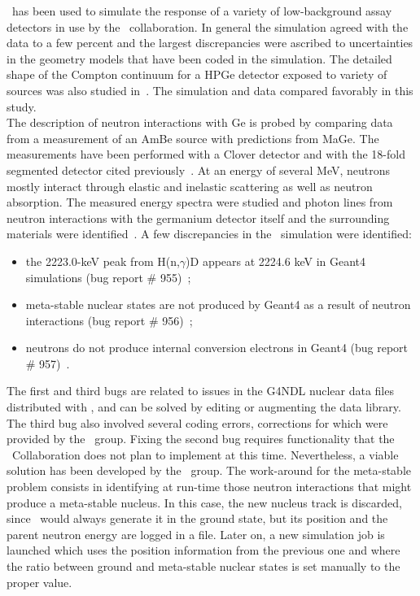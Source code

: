 \documentclass[article]{IEEEtran}
\begin{document}
\MaGe\ has been used to simulate the response of a variety of low-background assay detectors in use by the \MJ\ collaboration. In general the simulation agreed with the data to a few percent and the largest discrepancies were ascribed to uncertainties in the geometry models that have been coded in the 
simulation. 
The detailed shape of the Compton continuum for a HPGe detector exposed to variety of sources was also studied in~\cite{evans}. The simulation and data compared favorably in this study.\\ 

The description of neutron interactions with Ge is probed by comparing data
from a measurement of an AmBe source with predictions from {\sc
MaGe}. The measurements have been performed with a {\sc Clover}
detector and with the 18-fold segmented detector cited 
previously~\cite{siegfried_neutron}. At an energy of several
MeV, neutrons mostly interact through elastic and inelastic scattering
as well as neutron absorption. The measured energy spectra were
studied and photon lines from neutron interactions with the germanium
detector itself and the surrounding materials were
identified~\cite{Mei:2007zd}. 
A few discrepancies in the \GF\ simulation were identified:
\begin{itemize}
\item the 2223.0-keV peak from H(n,$\gamma$)D appears at 2224.6 keV 
in {\sc Geant4} simulations (bug report \# 955)~\cite{G4bug};
\item meta-stable nuclear states are not produced by {\sc Geant4} 
as a result of neutron interactions (bug report \# 956)~\cite{G4bug};
\item neutrons do not produce internal conversion electrons in 
{\sc Geant4} (bug report \# 957)~\cite{G4bug}.  
\end{itemize}
The first and third bugs are related to issues in the G4NDL nuclear data files distributed with
\GF, and can be solved by editing or augmenting the data library. 
The third bug also involved several coding errors, corrections for which were provided by
the \MaGe\ group. Fixing the second bug requires functionality that the \GF\ Collaboration does
not plan to implement at this time. 
Nevertheless, a viable solution has been developed by the \MaGe\ 
group. The work-around for the meta-stable problem consists in identifying 
at run-time those neutron interactions that might produce a meta-stable nucleus. In this 
case, the new nucleus track is discarded, since \GF\ would always generate it in 
the ground state, but its position and the parent neutron energy are logged in a file. 
Later on, a new simulation job is launched which uses the position information from 
the previous one and where the ratio between ground and meta-stable nuclear states 
is set manually to the proper value.  \\
\end{document}

